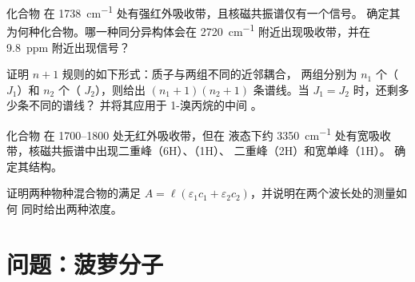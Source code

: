 \begin{exercise}[$\star\star$]\label{exo:b1:structure-spectroscopy:9}
化合物  在 \qty{1738}{cm^{-1}} 处有强红外吸收带，且核磁共振谱仅有一个信号。
确定其为何种化合物。哪一种同分异构体会在
\qty{2720}{cm^{-1}} 附近出现吸收带，并在 \qty{9.8}{ppm} 附近出现信号？
\end{exercise}

\begin{exercise}[$\star\star\star$]\label{exo:b1:structure-spectroscopy:10}
证明 $n + 1$ 规则的如下形式：质子与两组不同的近邻耦合，
两组分别为 $n_1$ 个（ $J_1$）和 $n_2$ 个（ $J_2$），则给出 $(n_1 +
1)(n_2 + 1)$ 条谱线。当 $J_1 = J_2$ 时，还剩多少条不同的谱线？
并将其应用于 1-溴丙烷的中间 。
\end{exercise}

\begin{exercise}[$\star\star\star$]\label{exo:b1:structure-spectroscopy:11}
化合物  在 1700--1800 处无红外吸收带，但在
液态下约 \qty{3350}{cm^{-1}} 处有宽吸收带，核磁共振谱中出现二重峰（6H）、（1H）、
二重峰（2H）和宽单峰（1H）。
确定其结构。
\end{exercise}

\begin{exercise}[$\star\star\star$]\label{exo:b1:structure-spectroscopy:12}
证明两种物种混合物的满足 $A = \ell(\varepsilon_1c_1
+ \varepsilon_2c_2)$，并说明在两个波长处的测量如何
同时给出两种浓度。
\end{exercise}

\section{问题：菠萝分子}

